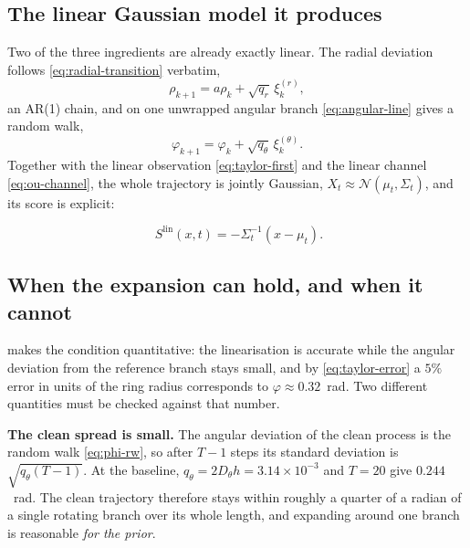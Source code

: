\documentclass[11pt,a4paper]{article}
\newcommand{\N}{\mathcal{N}}
\begin{document}
\subsection{The linear Gaussian model it produces}

Two of the three ingredients are already exactly linear. The radial deviation follows
\eqref{eq:radial-transition} verbatim,
\begin{equation}
 \rho_{k+1}=a\rho_k+\sqrt{q_r}\,\xi_k^{(r)} ,
 \label{eq:rho-ar1}
\end{equation}
an AR(1) chain, and on one unwrapped angular branch \eqref{eq:angular-line} gives a random
walk,
\begin{equation}
 \varphi_{k+1}=\varphi_k+\sqrt{q_\theta}\,\xi_k^{(\theta)} .
 \label{eq:phi-rw}
\end{equation}
Together with the linear observation \eqref{eq:taylor-first} and the linear channel
\eqref{eq:ou-channel}, the whole trajectory is jointly Gaussian, $X_t\approx\N(\mu_t,\Sigma_t)$,
and its score is explicit:

\begin{keyresult}
\begin{equation}
 \boxed{\;S^{\mathrm{lin}}(x,t)=-\Sigma_t^{-1}(x-\mu_t).}
 \label{eq:linear-score}
\end{equation}
\end{keyresult}

\subsection{When the expansion can hold, and when it cannot}\label{sec:taylor-validity}

 makes the condition quantitative: the linearisation is accurate while
the angular deviation from the reference branch stays small, and by
\eqref{eq:taylor-error} a $5\%$ error in units of the ring radius corresponds to
$\varphi\approx0.32$~rad. Two different quantities must be checked against that number.

\textbf{The clean spread is small.} The angular deviation of the clean process is the random
walk \eqref{eq:phi-rw}, so after $T-1$ steps its standard deviation is
$\sqrt{q_\theta(T-1)}$. At the baseline, $q_\theta=2D_\theta h=3.14\times10^{-3}$ and $T=20$
give $0.244$~rad. The clean trajectory therefore stays within roughly a quarter of a radian of
a single rotating branch over its whole length, and expanding around one branch is reasonable
\emph{for the prior}.
\end{document}
